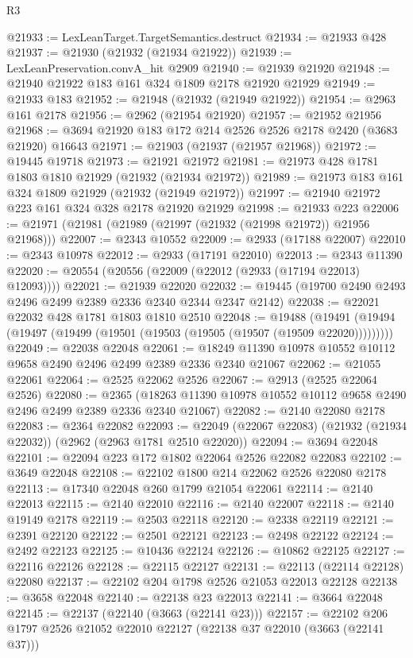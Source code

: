\begin{lexlean}{R3}
\begin{coremodule}
@21933 := LexLeanTarget.TargetSemantics.destruct
@21934 := @21933 @428
@21937 := @21930 (@21932 (@21934 @21922))
@21939 := LexLeanPreservation.convA_hit @2909
@21940 := @21939 @21920
@21948 := @21940 @21922 @183 @161 @324 @1809 @2178 @21920 @21929
@21949 := @21933 @183
@21952 := @21948 (@21932 (@21949 @21922))
@21954 := @2963 @161 @2178
@21956 := @2962 (@21954 @21920)
@21957 := @21952 @21956
@21968 := @3694 @21920 @183 @172 @214 @2526 @2526 @2178 @2420 (@3683 @21920) @16643
@21971 := @21903 (@21937 (@21957 @21968))
@21972 := @19445 @19718
@21973 := @21921 @21972
@21981 := @21973 @428 @1781 @1803 @1810 @21929 (@21932 (@21934 @21972))
@21989 := @21973 @183 @161 @324 @1809 @21929 (@21932 (@21949 @21972))
@21997 := @21940 @21972 @223 @161 @324 @328 @2178 @21920 @21929
@21998 := @21933 @223
@22006 := @21971 (@21981 (@21989 (@21997 (@21932 (@21998 @21972)) @21956 @21968)))
@22007 := @2343 @10552
@22009 := @2933 (@17188 @22007)
@22010 := @2343 @10978
@22012 := @2933 (@17191 @22010)
@22013 := @2343 @11390
@22020 := @20554 (@20556 (@22009 (@22012 (@2933 (@17194 @22013) @12093))))
@22021 := @21939 @22020
@22032 := @19445 (@19700 @2490 @2493 @2496 @2499 @2389 @2336 @2340 @2344 @2347 @2142)
@22038 := @22021 @22032 @428 @1781 @1803 @1810 @2510
@22048 := @19488
    (@19491 (@19494 (@19497 (@19499 (@19501 (@19503 (@19505 (@19507 (@19509 @22020)))))))))
@22049 := @22038 @22048
@22061 := @18249 @11390 @10978 @10552 @10112 @9658 @2490 @2496 @2499 @2389 @2336 @2340 @21067
@22062 := @21055 @22061
@22064 := @2525 @22062 @2526
@22067 := @2913 (@2525 @22064 @2526)
@22080 := @2365
    (@18263 @11390 @10978 @10552 @10112 @9658 @2490 @2496 @2499 @2389 @2336 @2340 @21067)
@22082 := @2140 @22080 @2178
@22083 := @2364 @22082
@22093 := @22049 (@22067 @22083) (@21932 (@21934 @22032)) (@2962 (@2963 @1781 @2510 @22020))
@22094 := @3694 @22048
@22101 := @22094 @223 @172 @1802 @22064 @2526 @22082 @22083
@22102 := @3649 @22048
@22108 := @22102 @1800 @214 @22062 @2526 @22080 @2178
@22113 := @17340 @22048 @260 @1799 @21054 @22061
@22114 := @2140 @22013
@22115 := @2140 @22010
@22116 := @2140 @22007
@22118 := @2140 @19149 @2178
@22119 := @2503 @22118
@22120 := @2338 @22119
@22121 := @2391 @22120
@22122 := @2501 @22121
@22123 := @2498 @22122
@22124 := @2492 @22123
@22125 := @10436 @22124
@22126 := @10862 @22125
@22127 := @22116 @22126
@22128 := @22115 @22127
@22131 := @22113 (@22114 @22128) @22080
@22137 := @22102 @204 @1798 @2526 @21053 @22013 @22128
@22138 := @3658 @22048
@22140 := @22138 @23 @22013
@22141 := @3664 @22048
@22145 := @22137 (@22140 (@3663 (@22141 @23)))
@22157 := @22102 @206 @1797 @2526 @21052 @22010 @22127 (@22138 @37 @22010 (@3663 (@22141 @37)))

\end{coremodule}
\end{lexlean}
